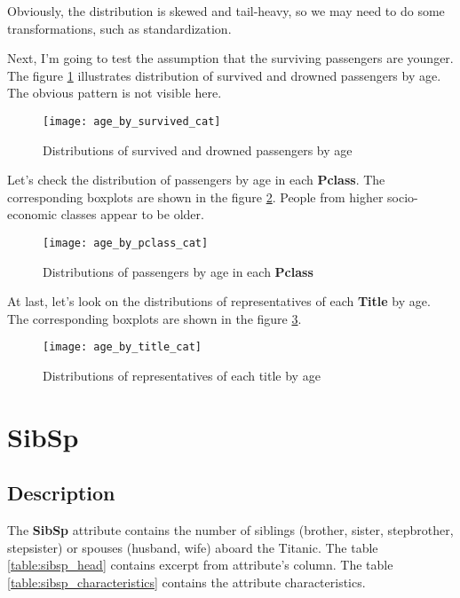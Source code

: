 Obviously, the distribution is skewed and tail-heavy, so we may need to 
do some transformations, such as standardization.

Next, I'm going to test the assumption that the surviving passengers are 
younger. The figure \ref{pic:age_by_survived_cat} illustrates distribution 
of survived and drowned passengers by age. The obvious pattern is not 
visible here.

\begin{figure}[!ht]
    \centering
    \texttt{[image: age\_by\_survived\_cat]}
    \caption{Distributions of survived and drowned passengers by age}
    \label{pic:age_by_survived_cat}
\end{figure}

Let's check the distribution of passengers by age in each \textbf{Pclass}.
The corresponding boxplots are shown in the figure \ref{pic:age_by_pclass_cat}.
People from higher socio-economic classes appear to be older.

\begin{figure}[!ht]
    \centering
    \texttt{[image: age\_by\_pclass\_cat]}
    \caption{Distributions of passengers by age in each \textbf{Pclass}}
    \label{pic:age_by_pclass_cat}
\end{figure}

At last, let's look on the distributions of representatives of each 
\textbf{Title} by age. The corresponding boxplots are shown in the figure 
\ref{pic:age_by_title_cat}.

\begin{figure}[!ht]
    \centering
    \texttt{[image: age\_by\_title\_cat]}
    \caption{Distributions of representatives of each title by age}
    \label{pic:age_by_title_cat}
\end{figure}


\section{SibSp} \label{section:SibSp}
\subsection{Description}
The \textbf{SibSp} attribute contains the number of siblings (brother, 
sister, stepbrother, stepsister) or spouses (husband, wife) aboard the 
Titanic. The table \ref{table:sibsp_head} contains excerpt from 
attribute's column. The table \ref{table:sibsp_characteristics} contains
the attribute characteristics.

